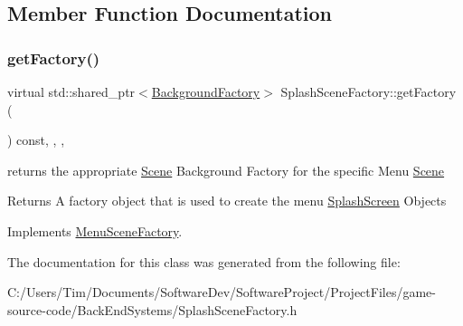 \subsection{Member Function Documentation}
\mbox{\label{class_splash_scene_factory_a08e3da2eb18122670b40c3520462db51}} 
\subsubsection{\texorpdfstring{get\+Factory()}{getFactory()}}
{\footnotesize\ttfamily virtual std\+::shared\+\_\+ptr$<$\hyperlink{class_background_factory}{Background\+Factory}$>$ Splash\+Scene\+Factory\+::get\+Factory (\begin{DoxyParamCaption}{ }\end{DoxyParamCaption}) const\hspace{0.3cm}{\ttfamily [inline]}, {\ttfamily [override]}, {\ttfamily [protected]}, {\ttfamily [virtual]}}



returns the appropriate \hyperlink{class_scene}{Scene} Background Factory for the specific Menu \hyperlink{class_scene}{Scene} 

\begin{DoxyReturn}{Returns}
A factory object that is used to create the menu \hyperlink{class_splash_screen}{Splash\+Screen} Objects 
\end{DoxyReturn}


Implements \hyperlink{class_menu_scene_factory_ad0f60a16fdbb10c6d7ba3311dafa2e76}{Menu\+Scene\+Factory}.



The documentation for this class was generated from the following file\+:\begin{DoxyCompactItemize}
\item 
C\+:/\+Users/\+Tim/\+Documents/\+Software\+Dev/\+Software\+Project/\+Project\+Files/game-\/source-\/code/\+Back\+End\+Systems/Splash\+Scene\+Factory.\+h\end{DoxyCompactItemize}

